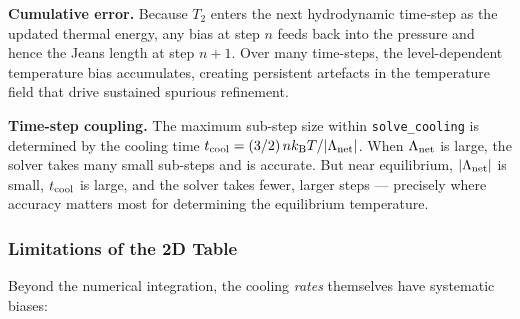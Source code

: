 \documentclass[fleqn,usenatbib]{mnras}
\newcommand{\code}[1]{\texttt{#1}}
\begin{document}
\textbf{Cumulative error.}
Because $T_2$ enters the next hydrodynamic time-step as the updated
thermal energy, any bias at step $n$ feeds back into the pressure
and hence the Jeans length at step $n{+}1$.  Over many time-steps,
the level-dependent temperature bias accumulates, creating persistent
artefacts in the temperature field that drive sustained spurious
refinement.

\textbf{Time-step coupling.}
The maximum sub-step size within \code{solve\_cooling} is determined by
the cooling time $t_{\rm cool} = (3/2)\,n k_{\rm B} T / |\Lambda_{\rm net}|$.
When $\Lambda_{\rm net}$ is large, the solver takes many small sub-steps
and is accurate.  But near equilibrium, $|\Lambda_{\rm net}|$ is small,
$t_{\rm cool}$ is large, and the solver takes fewer, larger steps ---
precisely where accuracy matters most for determining the equilibrium
temperature.

\subsubsection{Limitations of the 2D Table}
\label{sec:2d_table}

Beyond the numerical integration, the cooling \emph{rates} themselves
have systematic biases:
\end{document}
